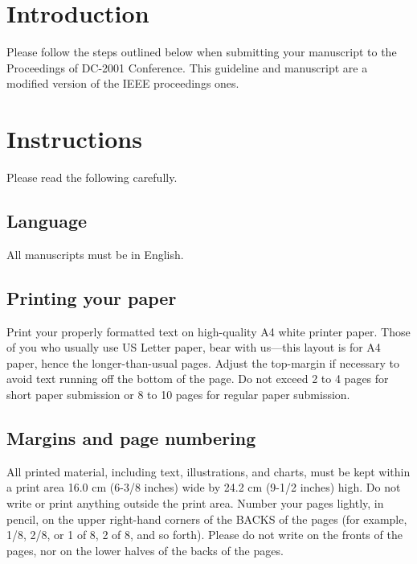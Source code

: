 \section{Introduction}

Please follow the steps outlined below when submitting your manuscript
to the Proceedings of DC-2001 Conference. This guideline and
manuscript are a modified version of the IEEE proceedings
ones\cite{latex8}.

\section{Instructions}

Please read the following carefully.

\subsection{Language}

All manuscripts must be in English.

\subsection{Printing your paper}

Print your properly formatted text on high-quality A4 white printer
paper. 
Those of you who usually use US Letter paper, bear with us---this
layout is for A4 paper, hence the longer-than-usual pages. Adjust the
top-margin if necessary to avoid text running off the bottom of the
page.
Do not exceed 2 to 4 pages for short paper submission or 
8 to 10 pages for regular paper submission.

\subsection{Margins and page numbering}

All printed material, including text, illustrations, and charts, must
be kept within a print area 16.0 cm (6-3/8 inches) wide by 24.2 cm
(9-1/2 inches) high. Do not write or print anything outside the print
area.  Number your pages lightly, in pencil, on the upper right-hand
corners of the BACKS of the pages (for example, 1/8, 2/8, or 1 of 8, 2
of 8, and so forth). Please do not write on the fronts of the pages,
nor on the lower halves of the backs of the pages.

